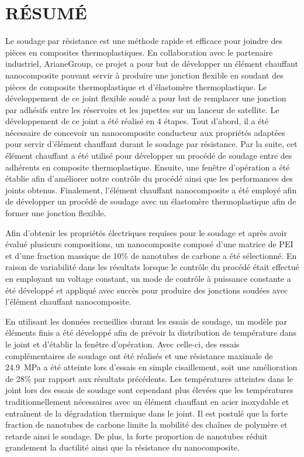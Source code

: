 %
\chapter*{RÉSUMÉ}\thispagestyle{headings}

Le soudage par résistance est une méthode rapide et efficace pour joindre des pièces en composites thermoplastiques. 
En collaboration avec le partenaire industriel, ArianeGroup, ce projet a pour but de développer un élément chauffant nanocomposite pouvant servir à produire une jonction flexible en soudant des pièces de composite thermoplastique et d'élastomère thermoplastique.
Le développement de ce joint flexible soudé a pour but de remplacer une jonction par adhésifs entre les réservoirs et les jupettes sur un lanceur de satellite. 
Le développement de ce joint a été réalisé en 4 étapes. 
Tout d'abord, il a été nécessaire de concevoir un nanocomposite conducteur aux propriétés adaptées pour servir d'élément chauffant durant le soudage par résistance. 
Par la suite, cet élément chauffant a été utilisé pour développer un procédé de soudage entre des adhérents en composite thermoplastique. 
Ensuite, une fenêtre d'opération a été établie afin d'améliorer notre contrôle du procédé ainsi que les performances des joints obtenus. 
Finalement, l'élément chauffant nanocomposite a été employé afin de développer un procédé de soudage avec un élastomère thermoplastique afin de former une jonction flexible. 

Afin d'obtenir les propriétés électriques requises pour le soudage et après avoir évalué plusieurs compositions, un nanocomposite composé d'une matrice de PEI et d'une fraction massique de 10\% de nanotubes de carbone a été sélectionné. 
En raison de variabilité dans les résultats lorsque le contrôle du procédé était effectué en employant un voltage constant, un mode de contrôle à puissance constante a été développé et appliqué avec succès pour produire des jonctions soudées avec l'élément chauffant nanocomposite.  

En utilisant les données recueillies durant les essais de soudage, un modèle par éléments finis a été développé afin de prévoir la distribution de température dans le joint et d'établir la fenêtre d'opération. 
Avec celle-ci, des essais complémentaires de soudage ont été réalisés et une résistance maximale de \SI[locale=FR]{24.9}{\mega\pascal} a été atteinte lors d'essais en simple cisaillement, soit une amélioration de 28\% par rapport aux résultats précédents. 
Les températures atteintes dans le joint lors des essais de soudage sont cependant plus élevées que les températures traditionnellement nécessaires avec un élément chauffant en acier inoxydable et entraînent de la dégradation thermique dans le joint. 
Il est postulé que la forte fraction de nanotubes de carbone limite la mobilité des chaînes de polymère et retarde ainsi le soudage. 
De plus, la forte proportion de nanotubes réduit grandement la ductilité ainsi que la résistance du nanocomposite. 

